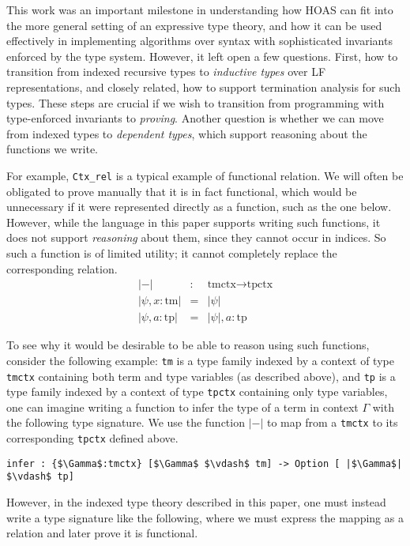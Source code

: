 \documentclass{article}
\begin{document}
This work was an important milestone in understanding how HOAS can fit
into the more general setting of an expressive type theory, and how it
can be used effectively in implementing algorithms over syntax with
sophisticated invariants enforced by the type system. However, it left open a few
questions. First, how to transition from indexed recursive types to
\emph{inductive types} over LF representations, and closely related, how to support termination analysis for
such types. These steps are crucial if we wish to transition from
programming with type-enforced invariants to \emph{proving}. Another question is whether we can move
from indexed types to \emph{dependent types}, which support reasoning
about the functions we write.

For example, \lstinline{Ctx_rel} is a typical example of
functional relation. We will often be obligated to prove manually
that it is in fact functional, which would be unnecessary if it
were represented directly as a function, such as the one
below. However, while the language in this paper supports writing such
functions, it does not support \emph{reasoning} about them, since they
cannot occur in indices. So such a function is of limited
utility; it cannot completely replace the corresponding relation.
\begin{eqnarray*}
|-| & : & \text{tmctx} \rightarrow \text{tpctx} \\
| \psi , x:\text{tm} | & = & | \psi | \\
| \psi , a:\text{tp} | & = & | \psi | , a:\text{tp}
\end{eqnarray*}

To see why it would be desirable to be able to reason using such
functions, consider the following example: \lstinline{tm} is a type family indexed by a context of type
\lstinline{tmctx} containing both term and type variables (as
described above), and \lstinline{tp} is a type family indexed by a
context of type \lstinline{tpctx} containing only type variables, one
can imagine writing a function to infer the type of a term in context
$\Gamma$ with the following type signature. We use the function $|-|$
to map from a \lstinline{tmctx} to its corresponding \lstinline{tpctx}
defined above.

\begin{lstlisting}
infer : {$\Gamma$:tmctx} [$\Gamma$ $\vdash$ tm] -> Option [ |$\Gamma$| $\vdash$ tp]
\end{lstlisting}

However, in the indexed type theory described in this paper, one must
instead write a type signature like the following, where we must
express the mapping as a relation and later prove it is functional.
\end{document}
